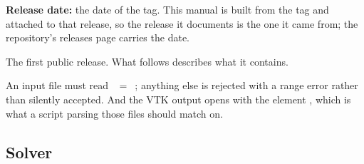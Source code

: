 \textbf{Release date:} the date of the  tag. This manual is built
from the tag and attached to that release, so the release it documents is the
one it came from; the repository's releases page carries the date.

The first public release. What follows describes what it contains.

\begin{note}
  An input file must read ~$=$~; anything
  else is rejected with a range error rather than silently accepted. And the
  VTK output opens with the element , which is what a
  script parsing those files should match on.
\end{note}

\subsection*{Solver}

